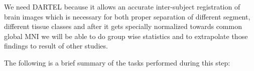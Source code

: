 \documentclass[12pt]{article}
\begin{document}
We need DARTEL because it allows an accurate inter-subject
registration of brain images which is necessary for both proper
separation of different segment, different tissue classes and after
it gets specially normalized towards common global MNI we will be able
to do group wise statistics and to extrapolate those findings to
result of other studies.

The following is a brief summary of the tasks performed during this
step:

\end{document}
